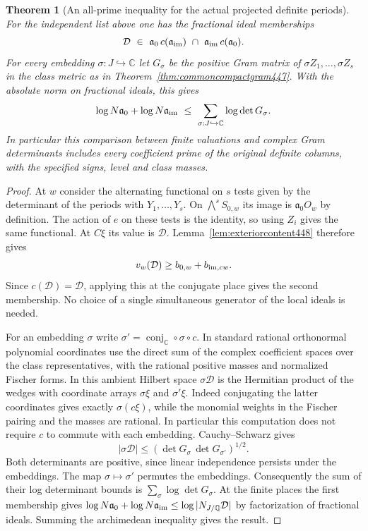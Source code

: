 \documentclass[a4paper,11pt]{article}
\newtheorem{theorem}[proposition]{Theorem}
\theoremstyle{definition}
\theoremstyle{remark}
\numberwithin{equation}{section}
\begin{document}
\begin{theorem}[An all-prime inequality for the actual projected definite periods]\leavevmode
\label{thm:globalperiodcontent448}
For the independent list above one has the fractional ideal
memberships
\[
   \mathcal D\ \in\
     \mathfrak a_0\,c(\mathfrak a_{\rm im})
                   \ \cap\ \mathfrak a_{\rm im}\,c(\mathfrak a_0).
\]
For every embedding \(\sigma:J\hookrightarrow\mathbb C\) let
\(G_\sigma\) be the positive Gram matrix of \(\sigma Z_1,\ldots,
\sigma Z_s\) in the class metric as in
Theorem~\ref{thm:commoncompactgram447}. With the absolute norm on
fractional ideals, this gives
\[
   \log N\mathfrak a_0+\log N\mathfrak a_{\rm im}
        \ \le\ \sum_{\sigma:J\hookrightarrow\mathbb C}\log\det G_\sigma .
\]
In particular this comparison between finite valuations and complex
Gram determinants includes every coefficient prime of the original
definite columns, with the specified signs, level and class masses.
\end{theorem}
\begin{proof}
At \(w\) consider the alternating functional on \(s\) tests given
by the determinant of the periods with \(Y_1,\ldots,Y_s\).
On \(\bigwedge^s S_{0,w}\) its image is
\(\mathfrak a_0O_w\) by definition. The action of \(e\) on
these tests is the identity, so using \(Z_i\) gives the same
functional. At \(C\xi\) its value is \(\mathcal D\).
Lemma~\ref{lem:exteriorcontent448} therefore gives
\[
                  v_w(\mathcal D)\ge b_{0,w}+b_{{\rm im},cw}.
\]
Since \(c(\mathcal D)=\mathcal D\), applying this at the conjugate
place gives the second membership. No choice of a single
simultaneous generator of the local ideals is needed.

For an embedding \(\sigma\) write
\(\sigma'=\operatorname{conj}_{\mathbb C}\circ\sigma\circ c\).
In standard rational orthonormal polynomial coordinates use the
direct sum of the complex coefficient spaces over the class
representatives, with the rational positive masses and normalized
Fischer forms. In this ambient Hilbert space \(\sigma\mathcal D\)
is the Hermitian product of the wedges with coordinate arrays
\(\sigma\xi\) and \(\sigma'\xi\). Indeed conjugating the latter
coordinates gives exactly \(\sigma(c\xi)\), while the monomial
weights in the Fischer pairing and the masses are rational.
In particular this computation does not require \(c\) to
commute with each embedding. Cauchy--Schwarz gives
\[
          |\sigma\mathcal D|\le
                 (\det G_\sigma\,\det G_{\sigma'})^{1/2}.
\]
Both determinants are positive, since linear independence persists
under the embeddings. The map \(\sigma\mapsto\sigma'\) permutes
the embeddings. Consequently the sum of their log determinant
bounds is \(\sum_\sigma\log\det G_\sigma\).
At the finite places the first membership gives
\(\log N\mathfrak a_0+\log N\mathfrak a_{\rm im}
\le \log|N_{J/\mathbb Q}\mathcal D|\) by factorization of
fractional ideals. Summing the archimedean inequality gives
the result.
\end{proof}
\end{document}
